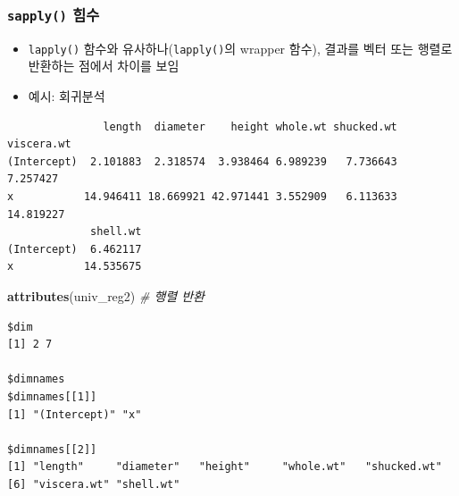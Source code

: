 \documentclass[
  11pt,
]{krantz}
\newenvironment{Shaded}{\begin{snugshade}}{\end{snugshade}}
\newcommand{\CommentTok}[1]{\textcolor[rgb]{0.37,0.37,0.37}{\textit{#1}}}
\newcommand{\ControlFlowTok}[1]{\textcolor[rgb]{0.27,0.27,0.27}{\textbf{#1}}}
\newcommand{\DecValTok}[1]{\textcolor[rgb]{0.06,0.06,0.06}{#1}}
\newcommand{\KeywordTok}[1]{\textcolor[rgb]{0.27,0.27,0.27}{\textbf{#1}}}
\newcommand{\NormalTok}[1]{#1}
\newcommand{\OperatorTok}[1]{\textcolor[rgb]{0.43,0.43,0.43}{\textbf{#1}}}
\newcommand{\StringTok}[1]{\textcolor[rgb]{0.5,0.5,0.5}{#1}}
\providecommand{\tightlist}{%
  \setlength{\itemsep}{0pt}\setlength{\parskip}{0pt}}
\begin{document}
\normalsize

\hypertarget{sapply}{%
\subsubsection*{\texorpdfstring{\texttt{sapply()} 힘수}{sapply() 힘수}}\label{sapply}}


\begin{itemize}
\tightlist
\item
  \texttt{lapply()} 함수와 유사하나(\texttt{lapply()}의 wrapper 함수), 결과를 벡터 또는 행렬로 반환하는 점에서 차이를 보임
\item
  예시: 회귀분석
\end{itemize}

\footnotesize

\begin{Shaded}
\end{Shaded}

\begin{verbatim}
               length  diameter    height whole.wt shucked.wt viscera.wt
(Intercept)  2.101883  2.318574  3.938464 6.989239   7.736643   7.257427
x           14.946411 18.669921 42.971441 3.552909   6.113633  14.819227
             shell.wt
(Intercept)  6.462117
x           14.535675
\end{verbatim}

\begin{Shaded}
\begin{Highlighting}[]
\KeywordTok{attributes}\NormalTok{(univ_reg2) }\CommentTok{# 행렬 반환}
\end{Highlighting}
\end{Shaded}

\begin{verbatim}
$dim
[1] 2 7

$dimnames
$dimnames[[1]]
[1] "(Intercept)" "x"          

$dimnames[[2]]
[1] "length"     "diameter"   "height"     "whole.wt"   "shucked.wt"
[6] "viscera.wt" "shell.wt"  
\end{verbatim}
\end{document}
